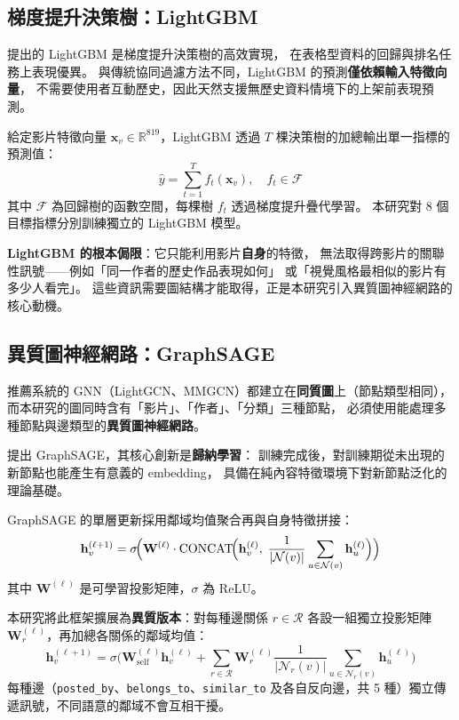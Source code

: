 \documentclass[12pt, a4paper]{article}
\begin{document}
\subsection{梯度提升決策樹：LightGBM}

\citet{ke2017lightgbm} 提出的 LightGBM 是梯度提升決策樹的高效實現，
在表格型資料的回歸與排名任務上表現優異。
與傳統協同過濾方法不同，LightGBM 的預測\textbf{僅依賴輸入特徵向量}，
不需要使用者互動歷史，因此天然支援無歷史資料情境下的上架前表現預測。

給定影片特徵向量 $\mathbf{x}_v \in \mathbb{R}^{819}$，LightGBM 透過
$T$ 棵決策樹的加總輸出單一指標的預測值：
\begin{equation}
  \hat{y} = \sum_{t=1}^{T} f_t(\mathbf{x}_v),
  \quad f_t \in \mathcal{F}
  \label{eq:lightgbm}
\end{equation}
其中 $\mathcal{F}$ 為回歸樹的函數空間，每棵樹 $f_t$ 透過梯度提升疊代學習。
本研究對 8 個目標指標分別訓練獨立的 LightGBM 模型。

\textbf{LightGBM 的根本侷限}：它只能利用影片\textbf{自身}的特徵，
無法取得跨影片的關聯性訊號——例如「同一作者的歷史作品表現如何」
或「視覺風格最相似的影片有多少人看完」。
這些資訊需要圖結構才能取得，正是本研究引入異質圖神經網路的核心動機。

\subsection{異質圖神經網路：GraphSAGE}

推薦系統的 GNN（LightGCN、MMGCN）都建立在\textbf{同質圖}上（節點類型相同），
而本研究的圖同時含有「影片」、「作者」、「分類」三種節點，
必須使用能處理多種節點與邊類型的\textbf{異質圖神經網路}。

\citet{hamilton2017inductive} 提出 GraphSAGE，其核心創新是\textbf{歸納學習}：
訓練完成後，對訓練期從未出現的新節點也能產生有意義的 embedding，
具備在純內容特徵環境下對新節點泛化的理論基礎。

GraphSAGE 的單層更新採用鄰域均值聚合再與自身特徵拼接：
\begin{equation}
  \mathbf{h}_v^{(\ell+1)} =
  \sigma\!\Bigl(
    \mathbf{W}^{(\ell)} \cdot
    \mathrm{CONCAT}\!\Bigl(
      \mathbf{h}_v^{(\ell)},\;
      \frac{1}{|\mathcal{N}(v)|}
      \sum_{u\in\mathcal{N}(v)} \mathbf{h}_u^{(\ell)}
    \Bigr)
  \Bigr)
  \label{eq:graphsage_orig}
\end{equation}
其中 $\mathbf{W}^{(\ell)}$ 是可學習投影矩陣，$\sigma$ 為 ReLU。

本研究將此框架擴展為\textbf{異質版本}：對每種邊關係 $r\in\mathcal{R}$
各設一組獨立投影矩陣 $\mathbf{W}_r^{(\ell)}$，再加總各關係的鄰域均值：
\begin{equation}
  \mathbf{h}_v^{(\ell+1)} =
  \sigma\!\Biggl(
    \mathbf{W}_{\mathrm{self}}^{(\ell)} \mathbf{h}_v^{(\ell)}
    + \sum_{r\in\mathcal{R}}
      \mathbf{W}_r^{(\ell)}
      \frac{1}{|\mathcal{N}_r(v)|}
      \sum_{u\in\mathcal{N}_r(v)} \mathbf{h}_u^{(\ell)}
  \Biggr)
  \label{eq:hetero_sage}
\end{equation}
每種邊（\texttt{posted\_by}、\texttt{belongs\_to}、\texttt{similar\_to}
及各自反向邊，共 5 種）獨立傳遞訊號，不同語意的鄰域不會互相干擾。
\end{document}
